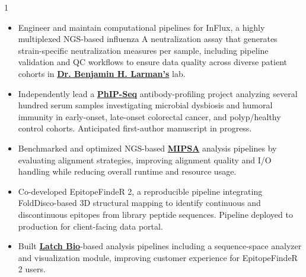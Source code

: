 \documentclass[11pt,letterpaper,withhyper]{altacv}
\begin{document}
\begin{paracol}{1}


\begin{itemize}
	\justifying
\item Engineer and maintain computational pipelines for InFlux, a highly multiplexed NGS-based influenza A neutralization assay that generates strain-specific neutralization measures per sample, including pipeline validation and QC workflows to ensure data quality across diverse patient cohorts in \href{https://profiles.hopkinsmedicine.org/provider/ben-larman/2777925}{\textbf{Dr. Benjamin H. Larman's}} lab.
\item Independently lead a \href{https://doi.org/10.3389/fbinf.2024.1424202}{\textbf{PhIP-Seq}} antibody-profiling project analyzing several hundred serum samples investigating microbial dysbiosis and humoral immunity in early-onset, late-onset colorectal cancer, and polyp/healthy control cohorts. Anticipated first-author manuscript in progress.
\end{itemize}
\divider

\begin{itemize}
	\justifying
	\item Benchmarked and optimized NGS-based \href{https://www.infinitybio.com/mipsa/}{\textbf{MIPSA}} analysis pipelines by evaluating alignment strategies, improving alignment quality and I/O handling while reducing overall runtime and resource usage.
	\item Co-developed EpitopeFindeR 2, a reproducible pipeline integrating FoldDisco-based 3D structural mapping to identify continuous and discontinuous epitopes from library peptide sequences. Pipeline deployed to production for client-facing data portal.
	\item Built \href{https://latch.bio/product/plots}{\textbf{Latch Bio}}-based analysis pipelines including a sequence-space analyzer and visualization module, improving customer experience for EpitopeFindeR 2 users.
\end{itemize}
\divider


\end{paracol}
\end{document}
